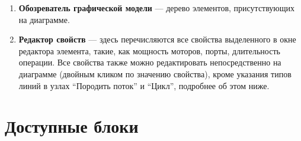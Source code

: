 \documentclass[a4paper,12pt,twoside]{article}
\begin{document}
\begin{enumerate}
  \item \textbf{Обозреватель графической модели} --- дерево элементов, присутствующих на диаграмме. 
  \item \textbf{Редактор свойств} --- здесь перечисляются все свойства выделенного в окне редактора элемента, такие, как мощность моторов, порты, длительность операции. Все свойства также можно редактировать непосредственно на диаграмме (двойным кликом по значению свойства), кроме указания типов линий в узлах "`Породить поток"' и "`Цикл"', подробнее об этом ниже.
\end{enumerate}

\section{Доступные блоки}
\end{document}
